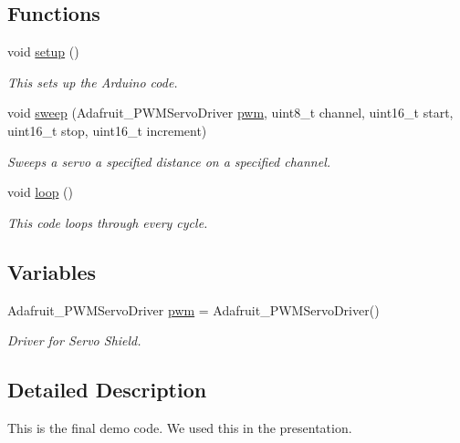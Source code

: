\subsection*{Functions}
\begin{DoxyCompactItemize}
\item 
void \hyperlink{_final___demo___code_8ino_a4fc01d736fe50cf5b977f755b675f11d}{setup} ()
\begin{DoxyCompactList}\small\item\em This sets up the Arduino code. \end{DoxyCompactList}\item 
void \hyperlink{_final___demo___code_8ino_a7b92333008667595c670f49489281efb}{sweep} (Adafruit\-\_\-\-P\-W\-M\-Servo\-Driver \hyperlink{_final___demo___code_8ino_a2c06cc8f85429bb0f7cb91917164dc54}{pwm}, uint8\-\_\-t channel, uint16\-\_\-t start, uint16\-\_\-t stop, uint16\-\_\-t increment)
\begin{DoxyCompactList}\small\item\em Sweeps a servo a specified distance on a specified channel. \end{DoxyCompactList}\item 
void \hyperlink{_final___demo___code_8ino_afe461d27b9c48d5921c00d521181f12f}{loop} ()
\begin{DoxyCompactList}\small\item\em This code loops through every cycle. \end{DoxyCompactList}\end{DoxyCompactItemize}
\subsection*{Variables}
\begin{DoxyCompactItemize}
\item 
Adafruit\-\_\-\-P\-W\-M\-Servo\-Driver \hyperlink{_final___demo___code_8ino_a2c06cc8f85429bb0f7cb91917164dc54}{pwm} = Adafruit\-\_\-\-P\-W\-M\-Servo\-Driver()
\begin{DoxyCompactList}\small\item\em Driver for Servo Shield. \end{DoxyCompactList}\end{DoxyCompactItemize}


\subsection{Detailed Description}
This is the final demo code. We used this in the presentation.

